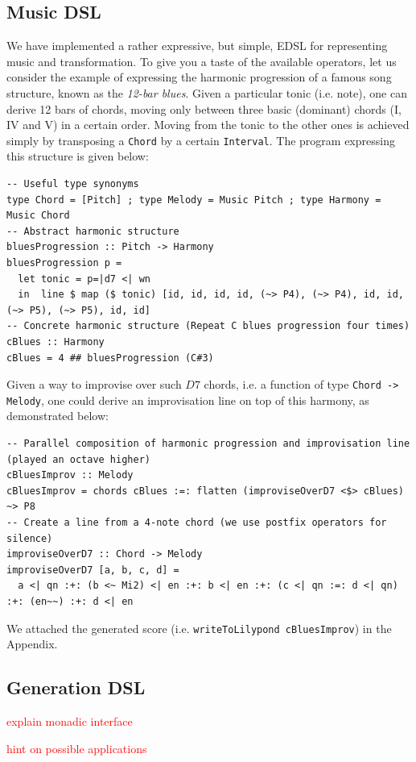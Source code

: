 \documentclass[11pt,a4paper]{article}
\newcommand{\icode}[1]{\texttt{#1}}
\newcommand\todo[1]{\textcolor{red}{#1}}
\begin{document}
\subsection{Music DSL}
We have implemented a rather expressive, but simple, EDSL for representing music and transformation. To give you a taste of the available operators, let us consider the example of expressing the harmonic progression of a famous song structure, known as the \textit{12-bar blues}. Given a particular tonic (i.e. note), one can derive 12 bars of chords, moving only between three basic (dominant) chords (I, IV and V) in a certain order. Moving from the tonic to the other ones is achieved simply by transposing a \icode{Chord} by a certain \icode{Interval}. The program expressing this structure is given below:
\begin{verbatim}
-- Useful type synonyms
type Chord = [Pitch] ; type Melody = Music Pitch ; type Harmony = Music Chord
-- Abstract harmonic structure
bluesProgression :: Pitch -> Harmony
bluesProgression p =
  let tonic = p=|d7 <| wn
  in  line $ map ($ tonic) [id, id, id, id, (~> P4), (~> P4), id, id, (~> P5), (~> P5), id, id]
-- Concrete harmonic structure (Repeat C blues progression four times)
cBlues :: Harmony
cBlues = 4 ## bluesProgression (C#3)
\end{verbatim}
Given a way to improvise over such $D7$ chords, i.e. a function of type \icode{Chord -> Melody}, one could derive an improvisation line on top of this harmony, as demonstrated below:
\begin{verbatim}
-- Parallel composition of harmonic progression and improvisation line (played an octave higher)
cBluesImprov :: Melody
cBluesImprov = chords cBlues :=: flatten (improviseOverD7 <$> cBlues) ~> P8
-- Create a line from a 4-note chord (we use postfix operators for silence)
improviseOverD7 :: Chord -> Melody
improviseOverD7 [a, b, c, d] =
  a <| qn :+: (b <~ Mi2) <| en :+: b <| en :+: (c <| qn :=: d <| qn) :+: (en~~) :+: d <| en
\end{verbatim}
We attached the generated score (i.e. \icode{writeToLilypond cBluesImprov}) in the Appendix.

\subsection{Generation DSL}
\todo{explain monadic interface}

\todo{hint on possible applications}
\end{document}
